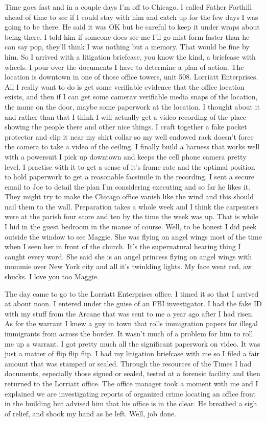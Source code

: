 Time goes fast and in a couple days I'm off to Chicago. I called Father Forthill ahead of time to see if I could stay with him and catch up for the few days I was going to be there. He said it was OK but be careful to keep it under wraps about being there. I told him if someone does see me I'll go mist form faster than he can say pop, they'll think I was nothing but a memory. That would be fine by him. So I arrived with a litigation briefcase, you know the kind, a briefcase with wheels. I pour over the documents I have to determine a plan of action. The location is downtown in one of those office towers, unit 508. Lorriatt Enterprises. All I really want to do is get some verifiable evidence that the office location exists, and then if I can get some camerav verifiable media snaps of the location, the name on the door, maybe some paperwork at the location. I thought about it and rather than that I think I will actually get a video recording of the place showing the people there and other nice things. I craft together a fake pocket protector and clip it near my shirt collar so my well endowed rack doesn't force the camera to take a video of the ceiling. I finally build a harness that works well with a powersuit I pick up downtown and keeps the cell phone camera pretty level. I practise with it to get a sense of it's frame rate and the optimal position to hold paperwork to get a reasonable facsimile in the recording. I sent a secure email to Joe to detail the plan I'm considering executing and so far he likes it. They might try to make the Chicago office vanish like the wind and this should nail them to the wall. Preparation takes a whole week and I think the carpenters were at the parish four score and ten by the time the week was up. That is while I hid in the guest bedroom in the manse of course. Well, to be honest I did peek outside the window to see Maggie. She was flying on angel wings most of the time  when I seen her in front of the church. It's the supernatural hearing thing I caught every word. She said she is an angel princess flying on angel wings with mommie over New York city and all it's twinkling lights. My face went red, aw shucks. I love you too Maggie.

The day came to go to the Lorriatt Enterprises office. I timed it so that I arrived at about noon. I entered under the guise of an FBI investigator. I had the fake ID with my stuff from the Arcane that was sent to me a year ago after I had risen. As for the warrant I knew a guy in town that rolls immigration papers for illegal immigrants from across the border. It wasn't much of a problem for him to roll me up a warrant. I got pretty much all the significant paperwork on video. It was just a matter of flip flip flip. I had my litigation briefcase with me so I filed a fair amount that was stamped or sealed. Through the resources of the Times I had documents, especially those signed or sealed, tested at a forensic facility and then returned to the  Lorriatt office. The office manager took a moment with me and I explained we are investigating reports of organized crime locating an office front in the building but advised him that his office is in the clear. He breathed a sigh of relief, and shook my hand as he left. Well, job done.

